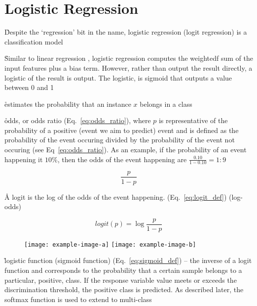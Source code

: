 \section{Logistic Regression}

\r{Despite the `regression' bit in the name, logistic regression (logit regression) is a classification model}

\r{Similar to linear regression \ALR, logistic regression computes the weightedf sum of the input features plus a bias term. However, rather than output the result directly, a logistic of the result is output. The logistic, is sigmoid \ALR that outputs a value between 0 and 1}

\r{estimates the probability that an instance $x$ belongs in a class}


\r{odds, or odds ratio (Eq.~\ref{eq:odds_ratio}), where $p$ is representative of the probability of a positive (event we aim to predict) event and is defined as the probability of the event occuring divided by the probability of the event not occuring (see Eq~\ref{eq:odds_ratio}).  As an example, if the probability of an event happening it $10\%$, then the odds of the event happening are $\frac{0.10}{1-0.10} = {1:9}$}

\begin{equation}
{\frac{p}{1-p}}
\label{eq:odds_ratio}
\end{equation}

\r{A logit is the log of the odds of the event happening. (Eq.~\ref{eq:logit_def}) (log-odds)}

\begin{equation}
{logit(p)=\log{\frac{p}{1-p}}}
\label{eq:logit_def}
\end{equation}


\begin{figure}[htp]
	\centering
	    \texttt{[image: example-image-a]}\hfil
		\texttt{[image: example-image-b]}\hfil
	\caption{}
	\label{fig:logit_vs_sigmoid}
\end{figure}

\r{logistic function (sigmoid function) (Eq.~\ref{eq:sigmoid_def}) -- the inverse of a logit function and corresponds to the probability that a certain sample belongs to a particular, positive, class. If the response variable value meets or exceeds the {discrimination threshold}, the positive class is predicted. As described later, the \ALR{} softmax function is used to extend to multi-class}


